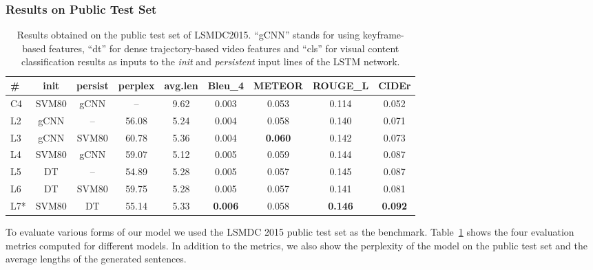 \subsubsection{Results on Public Test Set}
\begin{table}[t]
  \newcommand{\modpar}[4]{%
    \multirow{2}{*}{\emph{#1}} & \multirow{2}{*}{#2} & \multirow{2}{*}{#3}
    & \multirow{2}{*}{#4}}
  \newcommand{\bs}{\bf \small}
  \centering
  \begin{adjustbox}{center}
    \begin{tabular}{|l|c|c|c|c|c|c|c|c|}
        \hline\hline
        \bs \#   &\bs init &\bs persist &\bs perplex&\bs avg.len &\bs Bleu\_4&\bs METEOR &\bs ROUGE\_L &\bs CIDEr  \\\hline\hline
        C4   & SVM80 & gCNN  &  --   & 9.62  & 0.003   &   0.053 &   0.114&   0.052 \\\hline
        L2   & gCNN  & --    & 56.08 & 5.24  & 0.004   &   0.058 &   0.140&   0.071 \\
        L3   & gCNN  & SVM80 & 60.78 & 5.36  & 0.004   &\bf0.060 &   0.142&   0.073 \\
        L4   & SVM80 & gCNN  & 59.07 & 5.12  & 0.005   &   0.059 &   0.144&   0.087 \\\hline
        L5   & DT    & --    & 54.89 & 5.28  & 0.005   &   0.057 &   0.145&   0.087 \\
        L6   & DT    & SVM80 & 59.75 & 5.28  & 0.005   &   0.057 &   0.141&   0.081 \\
        L7*  & SVM80 & DT    & 55.14 & 5.33  &\bf0.006 &   0.058 &\bf0.146&\bf0.092 \\\hline
    \end{tabular}
  \end{adjustbox}
    \caption{Results obtained on the public test set of LSMDC2015. 
      ``gCNN'' stands for using keyframe-based features, ``dt'' for
      dense trajectory-based video features and ``cls'' for visual 
      content classification results as inputs to the \emph{init}
      and \emph{persistent} input lines of the LSTM network.
      }
    \label{tab:resLsmdcVal}
\end{table}

To evaluate various forms of our model we used the LSMDC 2015 public test
set as the benchmark. 
Table~\ref{tab:resLsmdcVal} shows the four evaluation metrics computed for different
models.
In addition to the metrics, we also show the perplexity of the model on the
public test set and the average lengths of the generated sentences.

